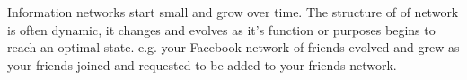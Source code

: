 

Information networks start small and grow over time.  The structure of of network
is often dynamic, it changes and evolves as it's function or purposes begins
to reach an optimal state.  e.g. your Facebook network of friends evolved and 
grew as your friends joined and requested to be added to your friends network.



